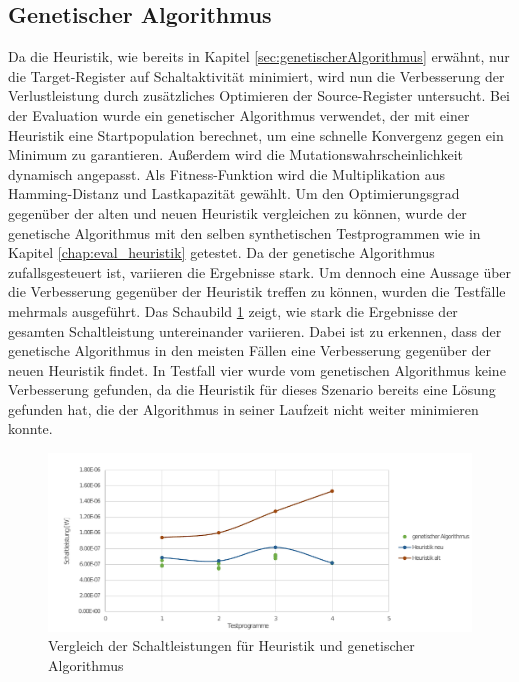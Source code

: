 \subsection{Genetischer Algorithmus}
Da die Heuristik, wie bereits in Kapitel \ref{sec:genetischerAlgorithmus} erwähnt, nur die Target-Register auf Schaltaktivität minimiert, wird nun die Verbesserung der Verlustleistung durch zusätzliches Optimieren der Source-Register untersucht.
Bei der Evaluation wurde ein genetischer Algorithmus verwendet, der mit einer Heuristik eine Startpopulation berechnet, um eine schnelle Konvergenz gegen ein Minimum zu garantieren. Außerdem wird die Mutationswahrscheinlichkeit dynamisch angepasst. Als Fitness-Funktion wird die Multiplikation aus Hamming-Distanz und Lastkapazität gewählt. 
Um den Optimierungsgrad gegenüber der alten und neuen Heuristik vergleichen zu können, wurde der genetische Algorithmus mit den selben synthetischen Testprogrammen wie in Kapitel \ref{chap:eval_heuristik} getestet.
Da der genetische Algorithmus zufallsgesteuert ist, variieren die Ergebnisse stark. Um dennoch eine Aussage über die Verbesserung gegenüber der Heuristik treffen zu können, wurden die Testfälle mehrmals ausgeführt. Das Schaubild \ref{fig:schaltleistung_genetic_heuristik} zeigt, wie stark die Ergebnisse der gesamten Schaltleistung untereinander variieren. Dabei ist zu erkennen, dass der genetische Algorithmus in den meisten Fällen eine Verbesserung gegenüber der neuen Heuristik findet. In Testfall vier wurde vom genetischen Algorithmus keine Verbesserung gefunden, da die Heuristik für dieses Szenario bereits eine Lösung gefunden hat, die der Algorithmus in seiner Laufzeit nicht weiter minimieren konnte.  
\begin{figure}[H]
	\centering
	\includegraphics[width=\textwidth]{fig/schaltleistung_genetic_heuristik.pdf}
	\caption{Vergleich der Schaltleistungen für Heuristik und genetischer Algorithmus}
	\label{fig:schaltleistung_genetic_heuristik}
\end{figure}

